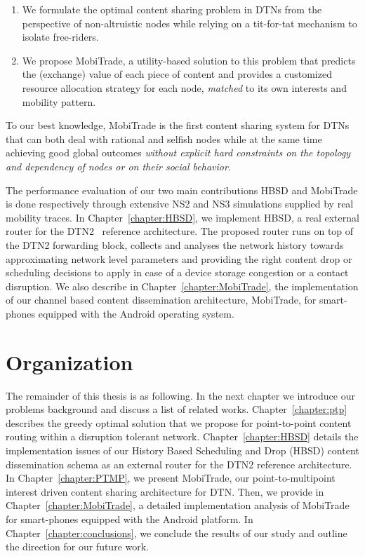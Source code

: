 \begin{enumerate}
    \item We formulate the optimal content sharing problem in DTNs from the perspective of non-altruistic nodes while relying on a tit-for-tat mechanism to isolate free-riders.
    \item We propose MobiTrade, a utility-based solution to this problem that predicts the (exchange) value of each piece of content and provides a customized resource allocation strategy for each node, \emph{matched} to its own interests and mobility pattern.
\end{enumerate}
To our best knowledge, MobiTrade is the first content sharing system for DTNs that can both deal with rational and selfish nodes while at the same time achieving good global outcomes \emph{without explicit hard constraints on the topology and dependency of nodes or on their social behavior}. 

The performance evaluation of our two main contributions HBSD and MobiTrade is done respectively through extensive NS2 and NS3 simulations supplied by real mobility traces. In Chapter~\ref{chapter:HBSD}, we implement HBSD, a real external router for the DTN2~\cite{DTN2} reference architecture. The proposed router runs on top of the DTN2 forwarding block, collects and analyses the network history towards approximating network level parameters and providing the right content drop or scheduling decisions to apply in case of a device storage congestion or a contact disruption. We also describe in Chapter~\ref{chapter:MobiTrade}, the implementation of our channel based content dissemination architecture, MobiTrade, for smart-phones equipped with the Android operating system. 

\section*{Organization}

The remainder of this thesis is as following. In the next chapter we introduce our problems background and discuss a list of related works. Chapter~\ref{chapter:ptp} describes the 
greedy optimal solution that we propose for point-to-point content routing within a disruption tolerant network. Chapter~\ref{chapter:HBSD} details the implementation issues of our History Based Scheduling and Drop (HBSD) content dissemination schema as an external router for the DTN2 reference architecture.  In Chapter~\ref{chapter:PTMP}, we present MobiTrade, our point-to-multipoint interest driven content sharing architecture for DTN. Then, we provide in Chapter~\ref{chapter:MobiTrade}, a detailed implementation analysis of MobiTrade for smart-phones equipped with the Android platform. In Chapter~\ref{chapter:conclusions}, we conclude the results of our
study and outline the direction for our future work.
